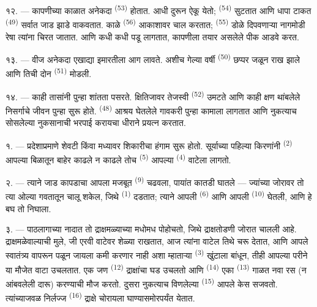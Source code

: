 \VUsaut{5.0mm}
\VUsaut{3.4mm}

१२. --- कापणीच्या काळात अनेकदा  \textsuperscript{(53)} होतात. आधी दुरून
 ऐकू येतो;  \textsuperscript{(54)} सुटतात
आणि धापा टाकत  \textsuperscript{(49)} सर्वात जाड झाडे वाकवतात. काळे
 \textsuperscript{(56)} आकाशावर चाल करतात;  \textsuperscript{(55)}
डोळे दिपवणाऱ्या नागमोडी रेषा त्यांना चिरत जातात.  आणि कधी कधी  पडू
लागतात, कापणीला तयार असलेले पीक आडवे करत.

१३. --- वीज अनेकदा एखाद्या इमारतीला आग लावते. अशीच गेल्या वर्षी 
\textsuperscript{(50)} छप्पर जळून राख झाले आणि तिची दोन  \textsuperscript{(51)}
मोडली.

१४. --- काही तासांनी पुन्हा शांतता पसरते. क्षितिजावर तेजस्वी 
\textsuperscript{(52)} उमटते आणि काही क्षण थांबलेले निसर्गाचे जीवन पुन्हा सुरू होते.
 \textsuperscript{(48)} आश्रय घेतलेले गावकरी पुन्हा कामाला लागतात आणि
नुकत्याच सोसलेल्या नुकसानाची भरपाई करायचा धीराने प्रयत्न करतात.

\VUsaut{6.0mm}
\VUsaut{3.6mm}

\VUsaut{1.4mm}
\VUsaut{4.0mm}

१. --- प्रदेशाप्रमाणे  शेवटी किंवा  मध्यावर शिकारीचा
हंगाम सुरू होतो. सूर्याच्या पहिल्या किरणांनी  \textsuperscript{(2)} आपल्या
बिळातून बाहेर काढले न काढले तोच  \textsuperscript{(5)} आपल्या
 \textsuperscript{(4)} वाटेला लागतो.

२. --- त्याने जाड कापडाचा आपला मजबूत  \textsuperscript{(9)} चढवला,
पायांत कातडी  घातले — ज्यांच्या जोरावर तो त्या ओल्या गवतातून चालू शकेल, जिथे
 \textsuperscript{(1)} दडतात; त्याने आपली 
\textsuperscript{(6)} आणि आपली  \textsuperscript{(10)} घेतली, आणि हे बघ
तो निघाला.

३. --- पाठलागाच्या नादात तो द्राक्षमळ्याच्या मधोमध पोहोचतो, जिथे द्राक्षतोडणी जोरात चालली आहे.
द्राक्षमळेवाल्याची मुले, जी एरवी वाटेवर शेळ्या राखतात, आज त्यांना वाटेल तिथे चरू देतात, आणि
आपले स्वातंत्र्य वापरून पळून जायला कमी करणार नाही अशा म्हाताऱ्या 
\textsuperscript{(3)} खुंटाला बांधून, तीही आपल्या परीने या मौजेत वाटा उचलतात. एक जण
 \textsuperscript{(12)} द्राक्षांचा घड उचलतो आणि 
\textsuperscript{(14)} एका  \textsuperscript{(13)} गाळत नवा रस (न आंबवलेली
दारू) करण्याची मौज करतो. दुसरा नुकत्याच विणलेल्या 
\textsuperscript{(15)} आपले केस सजवतो. त्यांच्याजवळ निर्लज्ज 
\textsuperscript{(16)} द्राक्षे चोरायला घाण्यासमोरपर्यंत येतात.


